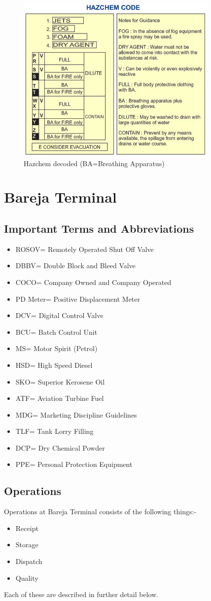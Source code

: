 \documentclass{report}
\begin{document}
	\begin{figure}[h]
		\centering
		\includegraphics[width=0.5\linewidth]{hazchem}
		\caption{Hazchem decoded (BA=Breathing Apparatus)}
		\label{hazchem}
	\end{figure}
\chapter{Bareja Terminal}
	\section{Important Terms and Abbreviations}
	\begin{itemize}
		\item ROSOV= Remotely Operated Shut Off Valve
		\item DBBV= Double Block and Bleed Valve
		\item COCO= Company Owned and Company Operated
		\item PD Meter= Positive Displacement Meter
		\item DCV= Digital Control Valve
		\item BCU= Batch Control Unit
		\item MS= Motor Spirit (Petrol)
		\item HSD= High Speed Diesel 
		\item SKO= Superior Kerosene Oil
		\item ATF= Aviation Turbine Fuel
		\item MDG= Marketing Discipline Guidelines
		\item TLF= Tank Lorry Filling
		\item DCP= Dry Chemical Powder
		\item PPE= Personal Protection Equipment
	\end{itemize}
	\section{Operations}
	Operations at Bareja Terminal consists of the following things:-
	\begin{itemize}
		\item Receipt
		\item Storage
		\item Dispatch
		\item Quality
	\end{itemize}
	Each of these are described in further detail below.
\end{document}
